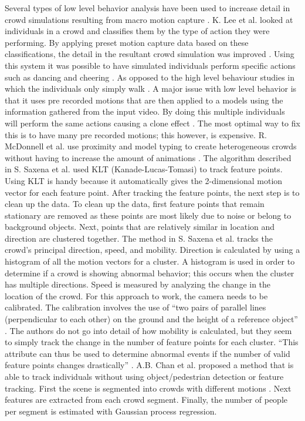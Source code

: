 \documentclass[12pt, onecolumn, conference]{IEEEtran}
\begin{document}
Several types of low level behavior analysis have been used to increase detail in crowd simulations resulting from macro motion capture \cite{K. Lee}. K. Lee et al. looked at individuals in a crowd and classifies them by the type of action they were performing. By applying preset motion capture data based on these classifications, the detail in the resultant crowd simulation was improved \cite{K. Lee}. 
Using this system it was possible to have simulated individuals perform specific actions such as dancing and cheering \cite{K. Lee}. As opposed to the high level behaviour studies in which the individuals only simply walk \cite{N. Courty}\cite{R. Mehran}.
A major issue with low level behavior is that it uses pre recorded motions that are then applied to a models using the information gathered from the input video. By doing this multiple individuals will perform the same actions causing a clone effect \cite{R. McDonnell}. The most optimal way to fix this is to have many pre recorded motions; this however, is expensive. R. McDonnell et al. use proximity and model typing to create heterogeneous crowds without having to increase the amount of animations \cite{R. McDonnell}.
The algorithm described in S. Saxena et al. used KLT (Kanade-Lucas-Tomasi) to track feature points. Using KLT is handy because it automatically gives the 2-dimensional motion vector for each feature point. After tracking the feature points, the next step is to clean up the data. To clean up the data, first feature points that remain stationary are removed as these points are most likely due to noise or belong to background objects. Next, points that are relatively similar in location and direction are clustered together.
The method in S. Saxena et al. tracks the crowd’s principal direction, speed, and mobility. Direction is calculated by using a histogram of all the motion vectors for a cluster. A histogram is used in order to determine if a crowd is showing abnormal behavior; this occurs when the cluster has multiple directions. Speed is measured by analyzing the change in the location of the crowd. For this approach to work, the camera needs to be calibrated. The calibration involves the use of “two pairs of parallel lines (perpendicular to each other) on the ground and the height of a reference object” \cite{S. Saxena}. The authors do not go into detail of how mobility is calculated, but they seem to simply track the change in the number of feature points for each cluster. “This attribute can thus be used to determine abnormal events if the number of valid feature points changes drastically” \cite{S. Saxena}.
A.B. Chan et al. proposed a method that is able to track individuals without using  object/pedestrian detection or feature tracking. First the scene is segmented into crowds with different motions \cite{A.B. Chan}. Next features are extracted from each crowd segment. Finally, the number of people per segment is estimated with Gaussian process regression.
\end{document}
